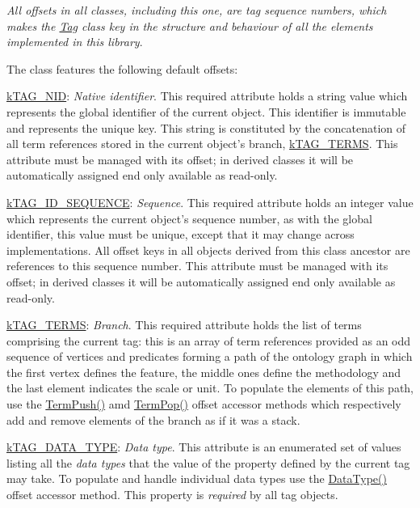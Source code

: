 {\itshape All offsets in all classes, including this one, are tag sequence numbers, which makes the \hyperlink{class_ontology_wrapper_1_1_tag}{Tag} class key in the structure and behaviour of all the elements implemented in this library}.

The class features the following default offsets\-:


\begin{DoxyItemize}
\item {\ttfamily \hyperlink{}{k\-T\-A\-G\-\_\-\-N\-I\-D}}\-: {\itshape Native identifier}. This required attribute holds a string value which represents the global identifier of the current object. This identifier is immutable and represents the unique key. This string is constituted by the concatenation of all term references stored in the current object's branch, \hyperlink{}{k\-T\-A\-G\-\_\-\-T\-E\-R\-M\-S}. This attribute must be managed with its offset; in derived classes it will be automatically assigned end only available as read-\/only. 
\item {\ttfamily \hyperlink{}{k\-T\-A\-G\-\_\-\-I\-D\-\_\-\-S\-E\-Q\-U\-E\-N\-C\-E}}\-: {\itshape Sequence}. This required attribute holds an integer value which represents the current object's sequence number, as with the global identifier, this value must be unique, except that it may change across implementations. All offset keys in all objects derived from this class ancestor are references to this sequence number. This attribute must be managed with its offset; in derived classes it will be automatically assigned end only available as read-\/only. 
\item {\ttfamily \hyperlink{}{k\-T\-A\-G\-\_\-\-T\-E\-R\-M\-S}}\-: {\itshape Branch}. This required attribute holds the list of terms comprising the current tag\-: this is an array of term references provided as an odd sequence of vertices and predicates forming a path of the ontology graph in which the first vertex defines the feature, the middle ones define the methodology and the last element indicates the scale or unit. To populate the elements of this path, use the \hyperlink{}{Term\-Push()} amd \hyperlink{}{Term\-Pop()} offset accessor methods which respectively add and remove elements of the branch as if it was a stack. 
\item {\ttfamily \hyperlink{}{k\-T\-A\-G\-\_\-\-D\-A\-T\-A\-\_\-\-T\-Y\-P\-E}}\-: {\itshape Data type}. This attribute is an enumerated set of values listing all the {\itshape data types} that the value of the property defined by the current tag may take. To populate and handle individual data types use the \hyperlink{}{Data\-Type()} offset accessor method. This property is {\itshape required} by all tag objects. 

\end{DoxyItemize}

